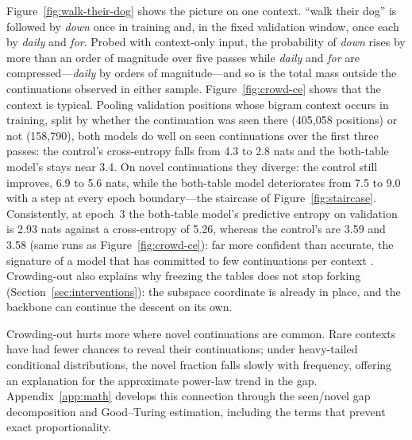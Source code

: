 Figure~\ref{fig:walk-their-dog} shows the picture on one context. ``walk their dog'' is followed by \emph{down} once in training and, in the fixed validation window, once each by \emph{daily} and \emph{for}. Probed with context-only input, the probability of \emph{down} rises by more than an order of magnitude over five passes while \emph{daily} and \emph{for} are compressed---\emph{daily} by orders of magnitude---and so is the total mass outside the continuations observed in either sample. Figure~\ref{fig:crowd-ce} shows that the context is typical. Pooling validation positions whose bigram context occurs in training, split by whether the continuation was seen there (405{,}058 positions) or not (158{,}790), both models do well on seen continuations over the first three passes: the control's cross-entropy falls from 4.3 to 2.8 nats and the both-table model's stays near 3.4. On novel continuations they diverge: the control still improves, 6.9 to 5.6 nats, while the both-table model deteriorates from 7.5 to 9.0 with a step at every epoch boundary---the staircase of Figure~\ref{fig:staircase}. Consistently, at epoch~3 the both-table model's predictive entropy on validation is 2.93 nats against a cross-entropy of 5.26, whereas the control's are 3.59 and 3.58 (same runs as Figure~\ref{fig:crowd-ce}): far more confident than accurate, the signature of a model that has committed to few continuations per context \citep{carlsson2025hyperfitting}. Crowding-out also explains why freezing the tables does not stop forking (Section~\ref{sec:interventions}): the subspace coordinate is already in place, and the backbone can continue the descent on its own.

Crowding-out hurts more where novel continuations are common. Rare contexts have had fewer chances to reveal their continuations; under heavy-tailed conditional distributions, the novel fraction falls slowly with frequency, offering an explanation for the approximate power-law trend in the gap. Appendix~\ref{app:math} develops this connection through the seen/novel gap decomposition and Good--Turing estimation, including the terms that prevent exact proportionality.

